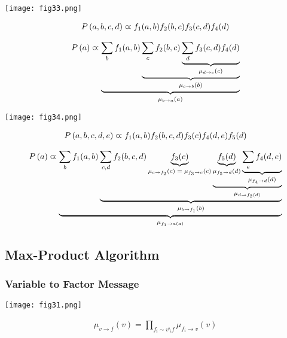 \begin{minipage}{0.4\textwidth}
	\centering
	\texttt{[image: fig33.png]}
\end{minipage}
\begin{minipage}{0.6\textwidth}
	\begin{align*}
		P\left(a,b,c,d\right)\varpropto f_1(a,b)f_2(b,c)f_3(c,d)f_4(d)
	\end{align*}
\end{minipage}

\begin{align*}
P\left(a\right)\varpropto\underbrace{\sum_bf_1(a,b)\underbrace{\sum_cf_2(b,c)\underbrace{\sum_df_3(c,d)f_4(d)}_\text{$\mu_{d\to c}(c)$}}_\text{$\mu_{c\to b}(b)$}}_\text{$\mu_{b\to a}(a)$}
\end{align*}

\begin{minipage}{0.4\textwidth}
	\centering
	\texttt{[image: fig34.png]}
\end{minipage}
\begin{minipage}{0.6\textwidth}
	\begin{align*}
		P\left(a,b,c,d,e\right)\varpropto f_1(a,b)f_2(b,c,d)f_3(c)f_4(d,e)f_5(d)
	\end{align*}
\end{minipage}

\begin{align*}
	P\left(a\right)\varpropto\underbrace{\sum_bf_1(a,b)\underbrace{\sum_{c,d}f_2(b,c,d)\underbrace{f_3(c)}_\text{$\mu_{c\to f_2}(c)=\mu_{f_3\to c}(c)$}\underbrace{\underbrace{f_5(d)}_\text{$\mu_{f_5\to d}(d)$}\underbrace{\sum_ef_4(d,e)}_\text{$\mu_{f_4\to d}(d)$}}_\text{$\mu_{d\to f_2(d)}$}}_\text{$\mu_{b\to f_1}(b)$}}_\text{$\mu_{f_1\to a(a)}$}
\end{align*}

\subsection{Max-Product Algorithm}

\subsubsection*{Variable to Factor Message}

\begin{minipage}{0.4\textwidth}
	\centering
	\texttt{[image: fig31.png]}
\end{minipage}
\begin{minipage}{0.6\textwidth}
	\begin{align*}
	\mu_{v\to f}(v)=\prod_{f_i\sim v\setminus f}\mu_{f_i\to v}(v)
	\end{align*}
\end{minipage}

